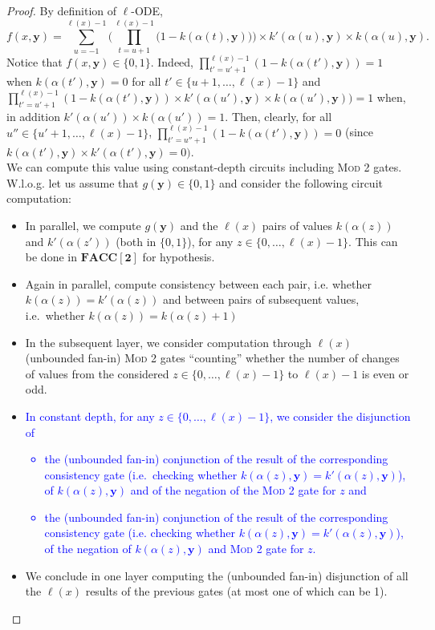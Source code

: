 \documentclass[11pt, oneside]{article}
\newcommand{\FACC}{\mathbf{FACC[2]}}
\newcommand{\tu}[1]{\mathbf{#1}}
\theoremstyle{definition}
\begin{document}
{\begin{proof}
By definition of $\ell$-ODE,
$$
f(x, \tu y) = \sum^{\ell(x)-1}_{u=-1} \Bigg(\prod^{\ell(x)-1}_{t=u+1} \Big(1-k(\alpha(t), \tu y)\Big) \Bigg) \times k'(\alpha(u), \tu y) \times k(\alpha(u), \tu y).
$$
Notice that $f(x, \tu y)\in \{0,1\}$.
%
Indeed, $\prod^{\ell(x)-1}_{t'=u'+1}(1-k(\alpha(t'), \tu y))=1$ when $k(\alpha(t'), \tu y)=0$ for all $t'\in \{u+1, \dots, \ell(x)-1\}$ and $\prod^{\ell(x)-1}_{t'=u'+1}(1-k(\alpha(t'), \tu y))\times k'(\alpha(u'), \tu y) \times k(\alpha(u'), \tu y)) =1$ when, in addition $k'(\alpha(u')) \times k(\alpha(u'))=1$.
Then, clearly, for all $u''\in \{u'+1, \dots, \ell(x)-1\}$, $\prod^{\ell(x)-1}_{t'=u''+1} (1-k(\alpha(t'), \tu y))=0$ (since $k(\alpha(t'), \tu y) \times k'(\alpha(t'), \tu y)=0)$.
\\
We can compute this value using constant-depth circuits including \textsc{Mod 2} gates.
%
W.l.o.g. let us assume that $g(\tu y)\in \{0,1\}$ and consider the following circuit computation:
\begin{itemize}
    \itemsep0em
    \item In parallel, we compute $g(\tu y)$ and the $\ell(x)$ pairs of values $k(\alpha(z))$ and $k'(\alpha(z'))$ (both in $\{0,1\}$), for any $z\in \{0, \dots, \ell(x)-1\}$.%
    This can be done in $\FACC$ for hypothesis.
    \item Again in parallel, compute consistency between each pair, i.e. whether $k(\alpha(z)) = k'(\alpha(z))$ and between pairs of subsequent values, i.e.~whether $k(\alpha(z))=k(\alpha(z)+1)$
    \item In the subsequent layer, we consider computation through $\ell(x)$ (unbounded fan-in) \textsc{Mod 2} gates ``counting'' whether the number of changes of values from the considered $z\in \{0, \dots, \ell(x)-1\}$ to $\ell(x)-1$ is even or odd.
    \item \textcolor{blue}{In constant depth, for any $z\in \{0,\dots, \ell(x)-1\}$, we consider the disjunction of
    \begin{itemize}
        \itemsep0em
        \item the (unbounded fan-in) conjunction of the result of the corresponding consistency gate (i.e.~checking whether $k(\alpha(z), \tu y)=k'(\alpha(z), \tu y)$), of $k(\alpha(z), \tu y)$ and of the negation of the \textsc{Mod 2} gate for $z$ and
        \item the (unbounded fan-in) conjunction of the result of the corresponding consistency gate (i.e. checking whether $k(\alpha(z), \tu y)=k'(\alpha(z), \tu y)$), of the negation of $k(\alpha(z), \tu y)$ and \textsc{Mod 2} gate for $z$.
    \end{itemize}}
    \item We conclude in one layer computing the (unbounded fan-in) disjunction of all the $\ell(x)$ results of the previous gates (at most one of which can be 1).
\end{itemize}
\end{proof}



}
\end{document}
